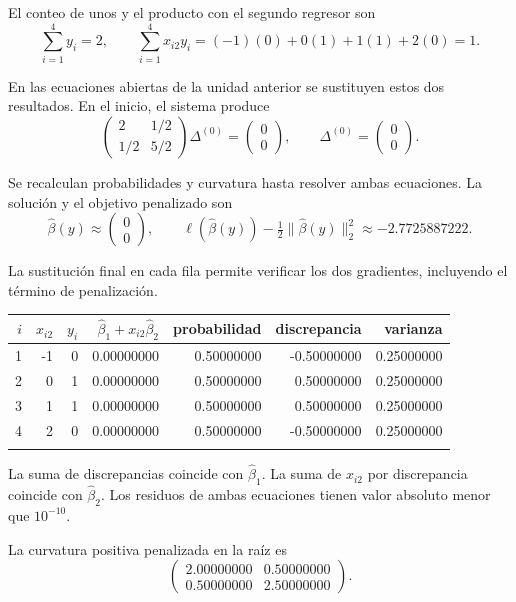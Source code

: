 \documentclass[11pt,a4paper]{article}
\begin{document}
El conteo de unos y el producto con el segundo regresor son
\[
\sum_{i=1}^4 y_i=2,\qquad\sum_{i=1}^4x_{i2}y_i=(-1)(0)+0(1)+1(1)+2(0)=1.
\]

En las ecuaciones abiertas de la unidad anterior se sustituyen
estos dos resultados. En el inicio, el sistema produce
\[
\begin{pmatrix}2&1/2\\1/2&5/2\end{pmatrix}\Delta^{(0)}=\begin{pmatrix}0\\0\end{pmatrix},\qquad\Delta^{(0)}=\begin{pmatrix}0\\0\end{pmatrix}.
\]

Se recalculan probabilidades y curvatura hasta resolver
ambas ecuaciones. La solución y el objetivo penalizado son
\[
\widehat\beta(y)\approx\begin{pmatrix}0\\0\end{pmatrix},\qquad \ell(\widehat\beta(y))-\tfrac12\|\widehat\beta(y)\|_2^2\approx-2.7725887222.
\]

La sustitución final en cada fila permite verificar
los dos gradientes, incluyendo el término de penalización.
\begin{center}\scriptsize
\begin{tabular}{rrrrrrr}\toprule
\(i\)&\(x_{i2}\)&\(y_i\)&\(\widehat\beta_1+x_{i2}\widehat\beta_2\)&probabilidad&discrepancia&varianza\\\midrule
1&-1&0&0.00000000&0.50000000&-0.50000000&0.25000000\\
2&0&1&0.00000000&0.50000000&0.50000000&0.25000000\\
3&1&1&0.00000000&0.50000000&0.50000000&0.25000000\\
4&2&0&0.00000000&0.50000000&-0.50000000&0.25000000\\
\\\bottomrule\end{tabular}\end{center}
La suma de discrepancias coincide con \(\widehat\beta_1\).
La suma de \(x_{i2}\) por discrepancia coincide con
\(\widehat\beta_2\). Los residuos de ambas ecuaciones
tienen valor absoluto menor que \(10^{-10}\).

La curvatura positiva penalizada en la raíz es
\[
\begin{pmatrix}2.00000000&0.50000000\\0.50000000&2.50000000\end{pmatrix}.
\]
\end{document}
